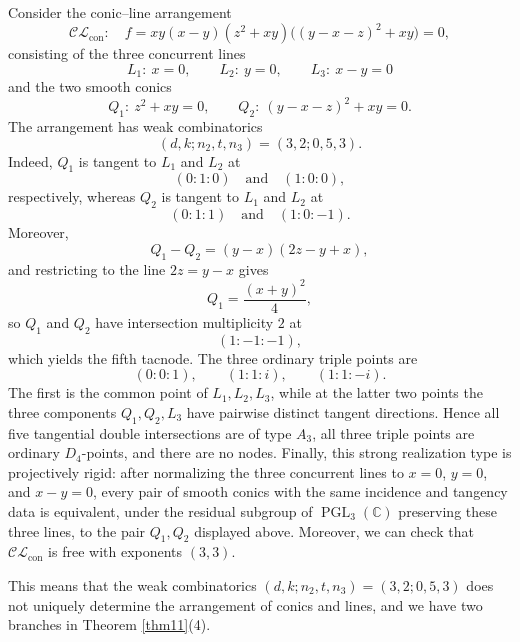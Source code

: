 \documentclass[12pt]{amsart}
\theoremstyle{plain}
\theoremstyle{definition}
\numberwithin{equation}{section}
\begin{document}
Consider the conic--line arrangement
\[
\mathcal{CL}_{\mathrm{con}}:\quad
f=xy(x-y)(z^2+xy)\big((y-x-z)^2+xy\big)=0,
\]
consisting of the three concurrent lines
\[
L_1:\ x=0,\qquad L_2:\ y=0,\qquad L_3:\ x-y=0
\]
and the two smooth conics
\[
Q_1:\ z^2+xy=0,\qquad
Q_2:\ (y-x-z)^2+xy=0.
\]
The arrangement has weak combinatorics
\[
(d,k;n_2,t,n_3)=(3,2;0,5,3).
\]
Indeed, \(Q_1\) is tangent to \(L_1\) and \(L_2\) at
\[
(0:1:0)\quad\text{and}\quad (1:0:0),
\]
respectively, whereas \(Q_2\) is tangent to \(L_1\) and \(L_2\) at
\[
(0:1:1)\quad\text{and}\quad (1:0:-1).
\]
Moreover,
\[
Q_1-Q_2=(y-x)(2z-y+x),
\]
and restricting to the line \(2z=y-x\) gives
\[
Q_1=\frac{(x+y)^2}{4},
\]
so \(Q_1\) and \(Q_2\) have intersection multiplicity \(2\) at
\[
(1:-1:-1),
\]
which yields the fifth tacnode. The three ordinary triple points are
\[
(0:0:1),\qquad (1:1:i),\qquad (1:1:-i).
\]
The first is the common point of \(L_1,L_2,L_3\), while at the latter
two points the three components \(Q_1,Q_2,L_3\) have pairwise distinct
tangent directions. Hence all five tangential double intersections are
of type \(A_3\), all three triple points are ordinary \(D_4\)-points,
and there are no nodes.  Finally, this strong realization
type is projectively rigid: after normalizing the three concurrent
lines to \(x=0\), \(y=0\), and \(x-y=0\), every pair of smooth conics
with the same incidence and tangency data is equivalent, under the
residual subgroup of \(\operatorname{PGL}_3(\mathbb{C})\) preserving
these three lines, to the pair \(Q_1,Q_2\) displayed above. Moreover, we can check that 
$\mathcal{CL}_{\mathrm{con}}$ is free with exponents $(3,3)$.

This means that the weak combinatorics $(d,k;n_2,t,n_3)=(3,2;0,5,3)$ does not uniquely determine the arrangement of conics and lines, and we have two branches in Theorem \ref{thm11}(4). 
\end{document}

